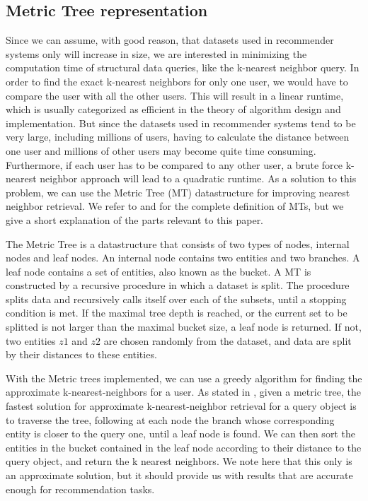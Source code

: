 \subsection{Metric Tree representation}
  Since we can assume, with good reason, that datasets used in recommender systems only will increase in size, we are interested in minimizing the computation time of structural data queries, like the k-nearest neighbor query.
  In order to find the exact k-nearest neighbors for only one user, we would have to compare the user with all the other users.
  This will result in a linear runtime, which is usually categorized as efficient in the theory of algorithm design and implementation. But since the datasets used in recommender systems tend to be very large, including millions of users, having to calculate the distance between one user and millions of other users may become quite time consuming.
  Furthermore, if each user has to be compared to any other user, a brute force k-nearest neighbor approach will lead to a quadratic runtime.
  As a solution to this problem, we can use the Metric Tree (MT) datastructure for improving nearest neighbor retrieval.
  We refer to \cite{jaeger2019counts} and \cite{uhlmann1991} for the complete definition of MTs, but we give a short explanation of the parts relevant to this paper.

  The Metric Tree is a datastructure that consists of two types of nodes, internal nodes and leaf nodes. An internal node contains two entities and two branches. A leaf node contains a set of entities, also known as the bucket.
  A MT is constructed by a recursive procedure in which a dataset is split. The procedure splits data and recursively calls itself over each of the subsets, until a stopping condition is met.
  If the maximal tree depth is reached, or the current set to be splitted is not larger than the maximal bucket size, a leaf node is returned.
  If not, two entities $z1$ and $z2$ are chosen randomly from the dataset, and data are split by their distances to these entities.

  With the Metric trees implemented, we can use a greedy algorithm for finding the approximate k-nearest-neighbors for a user.
  As stated in \cite{jaeger2019counts}, given a metric tree, the fastest solution for approximate k-nearest-neighbor retrieval for a query object is to traverse the tree, following at each node the branch whose corresponding entity is closer to the query one, until a leaf node is found.
  We can then sort the entities in the bucket contained in the leaf node according to their distance to the query object, and return the k nearest neighbors. We note here that this only is an approximate solution, but it should provide us with results that are accurate enough for recommendation tasks.
